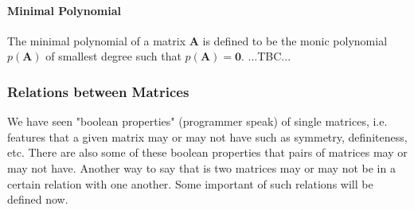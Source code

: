 


\paragraph{Minimal Polynomial}
The minimal polynomial of a matrix $\mathbf{A}$ is defined to be the monic polynomial $p(\mathbf{A})$ of smallest degree such that  $p(\mathbf{A}) = \mathbf{0}$. ...TBC...




\subsubsection{Relations between Matrices}
We have seen "boolean properties" (programmer speak) of single matrices, i.e. features that a given matrix may or may not have such as symmetry, definiteness, etc. There are also some of these boolean properties that pairs of matrices may or may not have. Another way to say that is two matrices may or may not be in a certain relation with one another. Some important of such relations will be defined now.


